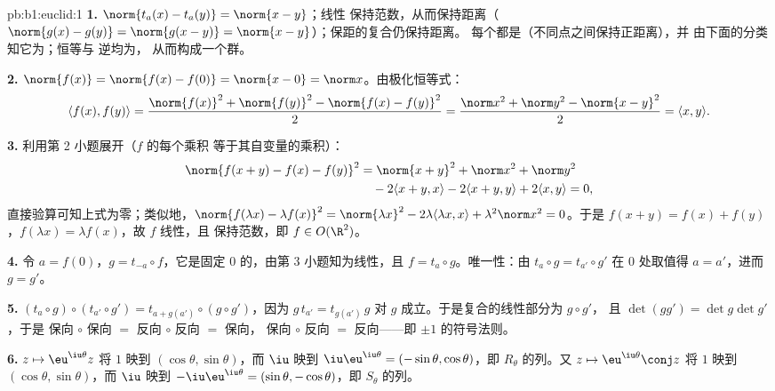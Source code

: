\begin{solution}{pb:b1:euclid:1}
\textbf{1.} $\norm{t_a(x) - t_a(y)} = \norm{x - y}$；线性
保持范数，从而保持距离（$\norm{g(x) - g(y)} =
\norm{g(x - y)} = \norm{x-y}$）；保距的复合仍保持距离。
每个都是（不同点之间保持正距离），并
由下面的分类知它为；恒等与
逆均为，
从而构成一个群。

\textbf{2.} $\norm{f(x)} = \norm{f(x) - f(0)} = \norm{x - 0} =
\norm x$。由极化恒等式：
\[
\langle f(x), f(y)\rangle
= \frac{\norm{f(x)}^2 + \norm{f(y)}^2 - \norm{f(x) -
f(y)}^2}{2}
= \frac{\norm x^2 + \norm y^2 - \norm{x - y}^2}{2}
= \langle x, y\rangle .
\]

\textbf{3.} 利用第 2 小题展开（$f$ 的每个乘积
等于其自变量的乘积）：
\begin{align*}
\norm{f(x+y) - f(x) - f(y)}^2
&= \norm{x+y}^2 + \norm x^2 + \norm y^2\\
&\quad - 2\langle x+y, x\rangle - 2\langle x+y, y\rangle
+ 2\langle x, y\rangle = 0 ,
\end{align*}
直接验算可知上式为零；类似地，$\norm{f(\lambda x) -
\lambda f(x)}^2 = \norm{\lambda x}^2 - 2\lambda\langle \lambda
x, x\rangle + \lambda^2\norm x^2 = 0$。于是 $f(x + y) = f(x) +
f(y)$，$f(\lambda x) = \lambda f(x)$，故 $f$ 线性，且
保持范数，即 $f \in O(\R^2)$。

\textbf{4.} 令 $a = f(0)$，$g = t_{-a}\circ f$，它是固定
$0$ 的，由第 3 小题知为线性，且 $f = t_a
\circ g$。唯一性：由 $t_a \circ g = t_{a'}\circ g'$ 在
$0$ 处取值得 $a = a'$，进而 $g = g'$。

\textbf{5.} $(t_a\circ g)\circ(t_{a'}\circ g') = t_{a +
g(a')}\circ(g\circ g')$，因为 $g\,t_{a'} = t_{g(a')}\,g$ 对
 $g$ 成立。于是复合的线性部分为 $g \circ g'$，
且 $\det(gg') = \det g \det g'$，于是
保向 $\circ$ 保向 $=$ 反向 $\circ$ 反向 $=$ 保向，
保向 $\circ$ 反向 $=$ 反向——即 $\pm1$ 的符号法则。

\textbf{6.} $z \mapsto \eu^{\iu\theta}z$ 将 $1$ 映到
$(\cos\theta, \sin\theta)$，而 $\iu$ 映到
$\iu\eu^{\iu\theta} = (-\sin\theta, \cos\theta)$，即
$R_\theta$ 的列。又 $z \mapsto \eu^{\iu\theta}\conj z$ 将 $1$ 映到
$(\cos\theta, \sin\theta)$，而 $\iu$ 映到 $-\iu\eu^{\iu\theta} =
(\sin\theta, -\cos\theta)$，即 $S_\theta$ 的列。


\end{solution}
